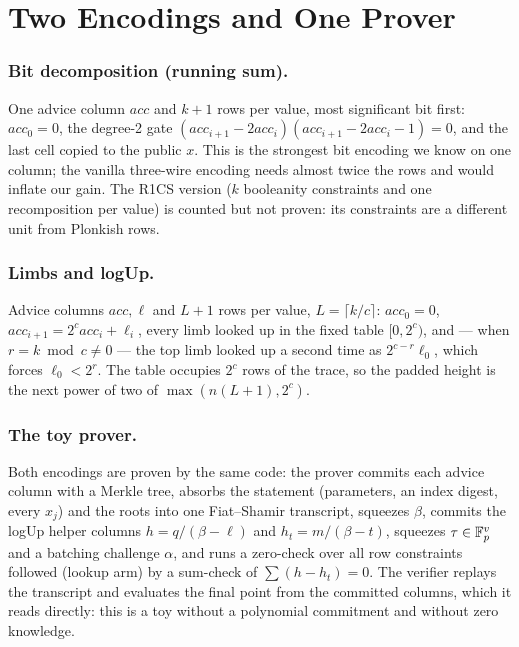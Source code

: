 \section{Two Encodings and One Prover}\label{sec:construction}

\subsubsection{Bit decomposition (running sum).} One advice column $\mathit{acc}$ and $k+1$ rows per value, most
significant bit first: $\mathit{acc}_0 = 0$, the degree-2 gate
$(\mathit{acc}_{i+1} - 2\mathit{acc}_i)(\mathit{acc}_{i+1} - 2\mathit{acc}_i - 1) = 0$, and the last cell copied to
the public $x$. This is the strongest bit encoding we know on one column; the vanilla three-wire encoding needs
almost twice the rows and would inflate our gain. The R1CS version ($k$ booleanity constraints and one
recomposition per value) is counted but not proven: its constraints are a different unit from Plonkish rows.

\subsubsection{Limbs and logUp.} Advice columns $\mathit{acc}, \ell$ and $L + 1$ rows per value,
$L = \lceil k/c \rceil$: $\mathit{acc}_0 = 0$, $\mathit{acc}_{i+1} = 2^c \mathit{acc}_i + \ell_i$, every limb looked up
in the fixed table $[0, 2^c)$, and --- when $r = k \bmod c \neq 0$ --- the top limb looked up a second time as
$2^{c-r}\ell_0$, which forces $\ell_0 < 2^r$. The table occupies $2^c$ rows of the trace, so the padded height is the
next power of two of $\max(n(L+1), 2^c)$.

\subsubsection{The toy prover.} Both encodings are proven by the same code: the prover commits each advice column
with a Merkle tree, absorbs the statement (parameters, an index digest, every $x_j$) and the roots into one
Fiat--Shamir transcript, squeezes $\beta$, commits the logUp helper columns $h = q/(\beta - \ell)$ and
$h_t = m/(\beta - t)$, squeezes $\tau \in \mathbb{F}_p^v$ and a batching challenge $\alpha$, and runs a zero-check over all
row constraints followed (lookup arm) by a sum-check of $\sum (h - h_t) = 0$. The verifier replays the transcript
and evaluates the final point from the committed columns, which it reads directly: this is a toy without a
polynomial commitment and without zero knowledge.
